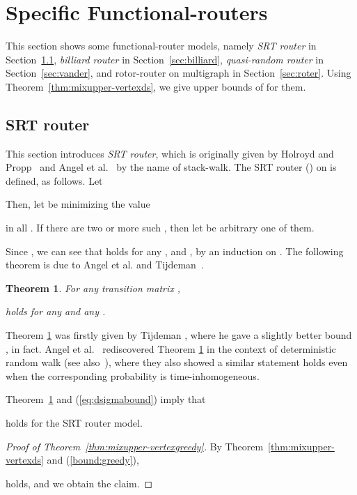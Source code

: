 \documentclass[letter, 11pt]{article}
\newcommand{\1}{\mbox{1}\hspace{-0.25em}\mbox{l}}
\newtheorem{theorem}{Theorem}[section]
\begin{document}
\section{Specific Functional-routers}\label{sec:routingmodel}This section shows some functional-router models, 
   namely {\em SRT router} in Section~\ref{sec:greedy}, 
    {\em billiard router} in Section~\ref{sec:billiard}, 
   {\em quasi-random router} in Section~\ref{sec:vander}, and  
   rotor-router on multigraph  in Section~\ref{sec:roter}. 
Using Theorem~\ref{thm:mixupper-vertexds}, we give upper bounds of  for them. 
\subsection{SRT router}\label{sec:greedy}This section introduces {\em SRT router}, 
  which is originally given by Holroyd and Propp~\cite{HP10} and Angel et al.~\cite{AJJ10} by the name of stack-walk. 
The SRT router  () on  is defined, as follows. 
Let 

Then, let  be  minimizing the value 

in all . 
If there are two or more such , then let  be arbitrary one of them. 

 Since ,  
  we can see that  holds 
  for any ,  and , 
  by an induction on . 
 The following theorem is 
  due to Angel et al. \cite{AJJ10} and Tijdeman~\cite{T80}.
\begin{theorem}\cite{T80, AJJ10}
\label{thm:upper-const}
 For any transition matrix , 

 holds for any  and any . 
\end{theorem}
Theorem \ref{thm:upper-const} was firstly given by Tijdeman \cite{T80}, 
   where he gave a slightly better bound 
  , in fact. 
 Angel et al.~\cite{AJJ10} rediscovered Theorem \ref{thm:upper-const} 
   in the context of deterministic random walk (see also~\cite{HP10}), 
  where they also showed a similar statement holds 
  even when the corresponding probability is time-inhomogeneous.  

Theorem~\ref{thm:upper-const} and (\ref{eq:dsigmabound}) imply that 

 holds for the SRT router model. 
 
 
\begin{proof}[Proof of Theorem~\ref{thm:mixupper-vertexgreedy}]
By Theorem~\ref{thm:mixupper-vertexds} and (\ref{bound:greedy}), 

holds, and we obtain the claim. 
\end{proof}
\end{document}
